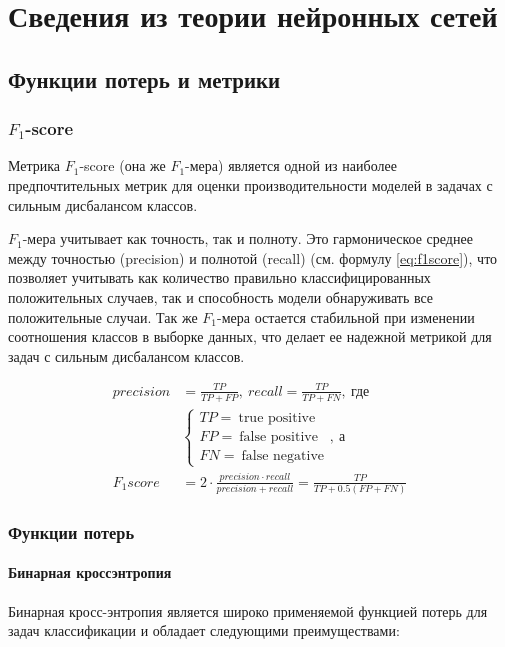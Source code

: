 \chapter{Сведения из теории нейронных сетей}

\section{Функции потерь и метрики}
\subsection{$F_1$-score}
Метрика $F_1$-score (она же $F_1$-мера) является одной из наиболее предпочтительных метрик для оценки
производительности моделей в задачах с сильным дисбалансом классов.

$F_1$-мера учитывает как точность, так и полноту. Это гармоническое среднее между
точностью (precision) и полнотой (recall) (см. формулу \ref{eq:f1score}), что позволяет
учитывать как количество правильно классифицированных положительных случаев,
так и способность модели обнаруживать все положительные случаи. Так же $F_1$-мера
остается стабильной при изменении соотношения классов в выборке данных, что
делает ее надежной метрикой для задач с сильным дисбалансом классов.

\begin{align}
	precision & = \frac{TP}{TP + FP}, \: recall = \frac{TP}{TP + FN}, \: \text{где} \\
	          & \begin{cases}
		            TP = \: \text{true positive}  \\
		            FP = \: \text{false positive} \\
		            FN = \: \text{false negative}
	            \end{cases}, \: \text{а} \\
	F_1score  & = 2 \cdot \frac{precision \cdot recall}{precision + recall} = \frac{TP}{TP + 0.5(FP + FN)}
	\label{eq:f1score}
\end{align}

\subsection{Функции потерь}
\subsubsection{Бинарная кроссэнтропия}

Бинарная кросс-энтропия является широко применяемой функцией потерь для задач
классификации и обладает следующими преимуществами:

